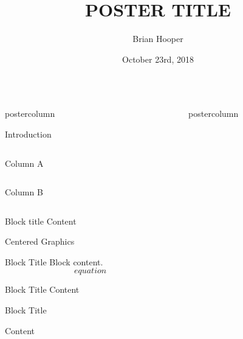 \documentclass[final,hyperref={pdfpagelabels=false}]{beamer}
\title{\huge POSTER TITLE}
\author{Brian Hooper}
\institute{Central Washington University}
\date[October 23rd, 2018]{October 23rd, 2018}
\newlength{\columnheight}
\begin{document}
	\begin{frame}
		\begin{columns}
			\begin{column}{.49\textwidth}
				\begin{beamercolorbox}[center,wd=\textwidth]{postercolumn}
					\begin{minipage}[T]{.95\textwidth}
						\parbox[t][\columnheight]{\textwidth}{
						
							\begin{block}{Introduction}
								\begin{column}{.24\textwidth}
									Column A
								\end{column}
								\begin{column}{.70\textwidth}
									Column B
								\end{column}
							\end{block}\vfill
							
							\begin{block}{Block title}
								Content \\
								\begin{center} 
									Centered Graphics
								\end{center}
							\end{block}\vfill
							
							\begin{block}{Block Title}
								Block content.\\
				
								\begin{equation}
									equation
								\end{equation}
							\end{block}\vfill
							
							\begin{block}{Block Title}
								Content
							\end{block}\vfill
				
							\begin{block}{Block Title}
									
									Content
							\end{block}\vfill
							
					}
					\end{minipage}
				\end{beamercolorbox}
			\end{column}
			\begin{column}{.49\textwidth}
				\begin{beamercolorbox}[center,wd=\textwidth]{postercolumn}
					\begin{minipage}[T]{.95\textwidth}
						\parbox[t][\columnheight]{\textwidth}{
							
}
\end{minipage}
\end{beamercolorbox}
\end{column}
\end{columns}
\end{frame}
\end{document}
